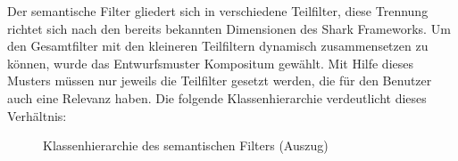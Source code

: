 \label{ch:filtercomps}
Der semantische Filter gliedert sich in verschiedene Teilfilter, diese Trennung richtet sich nach den bereits bekannten Dimensionen des Shark Frameworks. Um den Gesamtfilter mit den kleineren Teilfiltern dynamisch zusammensetzen zu können, wurde das Entwurfsmuster Kompositum gewählt. Mit Hilfe dieses Musters müssen nur jeweils die Teilfilter gesetzt werden, die für den Benutzer auch eine Relevanz haben. Die folgende Klassenhierarchie verdeutlicht dieses Verhältnis:
\begin{figure}[H]
	\centering
	\hspace*{1cm}
	\caption{Klassenhierarchie des semantischen Filters (Auszug)}
	\label{fig:broadcastStructure}
\end{figure} 
